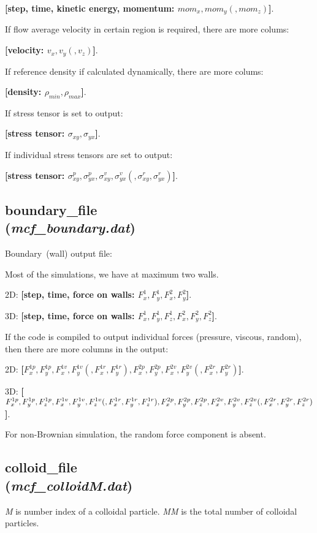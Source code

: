 \documentclass[a4paper,10pt]{article}
\begin{document}
\textbf{[step, time, kinetic energy, momentum: $mom_x, mom_y(, mom_z)$]}.

If flow average velocity in certain region is required, 
there are more colums:

\textbf{[velocity: $v_x, v_y(, v_z)$]}.

If reference density if calculated dynamically,
there are more colums:

\textbf{[density: $\rho_{min}, \rho_{max}$]}.

If stress tensor is set to output:

\textbf{[stress tensor: $\sigma_{xy}, \sigma_{yx}$]}.

If individual stress tensors are set to output:

\textbf{[stress tensor: 
$\sigma^p_{xy}, \sigma^p_{yx},
\sigma^v_{xy}, \sigma^v_{yx}
(,\sigma^r_{xy}, \sigma^r_{yx})$]}.

\subsection{\textbf{boundary\_file}\\
(\textit{mcf\_boundary.dat})}
Boundary~(wall) output file:

Most of the simulations, we have at maximum two walls.


2D: \textbf{[step, time, force on walls:  $F^1_x, F^1_y, F^2_x, F^2_y$]}.

3D: \textbf{[step, time, force on walls:  $F^1_x, F^1_y, F^1_z, F^2_x, F^2_y, F^2_z$]}.

If the code is compiled to output individual forces (pressure, viscous, random),
then there are more columns in the output:

2D: \textbf{[$F^{1p}_x, F^{1p}_y, 
F^{1v}_x, F^{1v}_y
(,F^{1r}_x, F^{1r}_y),
F^{2p}_x, F^{2p}_y, 
F^{2v}_x, F^{2v}_y
(,F^{2r}_x, F^{2r}_y)$]}.

3D: \textbf{[$F^{1p}_x, F^{1p}_y, F^{1p}_z, 
F^{1v}_x, F^{1v}_y, F^{1v}_z
(,F^{1r}_x, F^{1r}_y, F^{1r}_z),\\
F^{2p}_x, F^{2p}_y, F^{2p}_z, 
F^{2v}_x, F^{2v}_y, F^{2v}_z
(,F^{2r}_x, F^{2r}_y, F^{2r}_z)$]}.

For non-Brownian simulation, the random force component is absent.

\subsection{\textbf{colloid\_file}\\
(\textit{mcf\_colloidM.dat})}
\textit{M} is number index of a colloidal particle.
\textit{MM} is the total number of colloidal particles.
\end{document}
